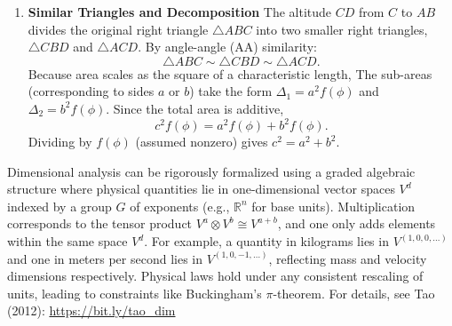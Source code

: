 {\begin{enumerate}
\begin{center}
\begin{tikzpicture}[scale=1]
    \end{tikzpicture}
    \end{center}
    \item \textbf{Similar Triangles and Decomposition}  
    \newline
    The altitude $CD$ from $C$ to $AB$ divides the original right triangle $\triangle ABC$ into two smaller right triangles, $\triangle CBD$ and $\triangle ACD$. By angle-angle (AA) similarity:
    \[
    \triangle ABC \sim \triangle CBD \sim \triangle ACD.
    \]
    Because area scales as the square of a characteristic length, The sub-areas (corresponding to sides $a$ or $b$) take the form $\Delta_1 = a^2 f(\phi)$ and $\Delta_2 = b^2 f(\phi)$.
    Since the total area is additive,  
    \[
    c^2 f(\phi) = a^2 f(\phi) + b^2 f(\phi).
    \]
    Dividing by $f(\phi)$ (assumed nonzero) gives
    $c^2 = a^2 + b^2$.
\end{enumerate} 
\newline
Dimensional analysis can be rigorously formalized using a graded algebraic structure where physical quantities lie in one-dimensional vector spaces $V^d$ indexed by a group $G$ of exponents (e.g., $\mathbb{R}^n$ for base units). Multiplication corresponds to the tensor product $V^a \otimes V^b \cong V^{a+b}$, and one only adds elements within the same space $V^d$. For example, a quantity in kilograms lies in $V^{(1,0,0,\ldots)}$ and one in meters per second lies in $V^{(1,0,-1,\ldots)}$, reflecting mass and velocity dimensions respectively. Physical laws hold under any consistent rescaling of units, leading to constraints like Buckingham's $\pi$-theorem.  
For details, see Tao (2012):  
\href{https://terrytao.wordpress.com/2012/12/29/a-mathematical-formalisation-of-dimensional-analysis/}{\textrm{https://bit.ly/tao\_dim}}
}
